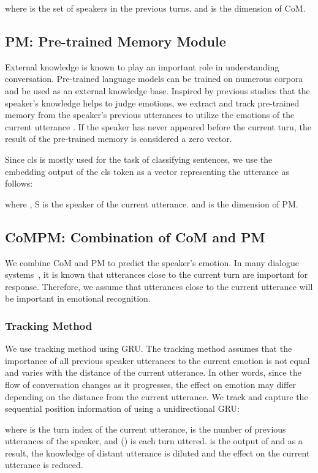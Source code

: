 \documentclass[11pt]{article}
\begin{document}
where  is the set of speakers in the previous turns.  and  is the dimension of CoM.

\subsection{PM: Pre-trained Memory Module}
External knowledge is known to play an important role in understanding conversation. Pre-trained language models can be trained on numerous corpora and be used as an external knowledge base. Inspired by previous studies that the speaker's knowledge helps to judge emotions, we extract and track pre-trained memory from the speaker's previous utterances to utilize the emotions of the current utterance . If the speaker has never appeared before the current turn, the result of the pre-trained memory is considered a zero vector.


Since cls is mostly used for the task of classifying sentences, we use the embedding output of the cls token as a vector representing the utterance as follows:



where , S is the speaker of the current utterance.  and  is the dimension of PM.

\subsection{CoMPM: Combination of CoM and PM}
We combine CoM and PM to predict the speaker's emotion. In many dialogue systems~\cite{zhang-etal-2018-modeling, ma-etal-2019-triplenet}, it is known that utterances close to the current turn are important for response. Therefore, we assume that utterances close to the current utterance will be important in emotional recognition. 


\subsubsection{Tracking Method}
\label{sec:tracking}
We use  tracking method using GRU. The tracking method assumes that the importance of all previous speaker utterances to the current emotion is not equal and varies with the distance of the current utterance. In other words, since the flow of conversation changes as it progresses, the effect on emotion may differ depending on the distance from the current utterance. We track and capture the sequential position information of  using a unidirectional GRU:



where  is the turn index of the current utterance,  is the number of previous utterances of the speaker, and  () is each turn uttered.  is the output of  and as a result, the knowledge of distant utterance is diluted and the effect on the current utterance is reduced.
\end{document}
